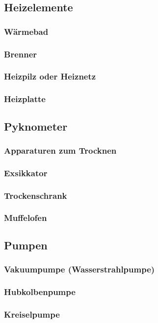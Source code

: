 \subsection{Heizelemente}
\subsubsection{Wärmebad}
\subsubsection{Brenner}
\subsubsection{Heizpilz oder Heiznetz}
\subsubsection{Heizplatte}

\subsection{Pyknometer}

\subsubsection{Apparaturen zum Trocknen}
\subsubsection{Exsikkator}
\subsubsection{Trockenschrank}
\subsubsection{Muffelofen}

\subsection{Pumpen}
\subsubsection{Vakuumpumpe (Wasserstrahlpumpe)}
\subsubsection{Hubkolbenpumpe}
\subsubsection{Kreiselpumpe}

